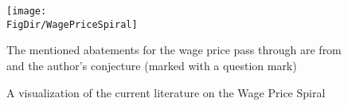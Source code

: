 \begin{figure}[ht]
  \centerline{
    \texttt{[image: \\FigDir/WagePriceSpiral]}
  }
  \caption{A visualization of the current literature on the Wage Price Spiral} \label{fig:WagePriceSpiral}
  \footnotesize{The mentioned abatements for the wage price pass through are from \cite{Heiseetal2020} and the author's conjecture (marked with a question mark)}
\end{figure}
